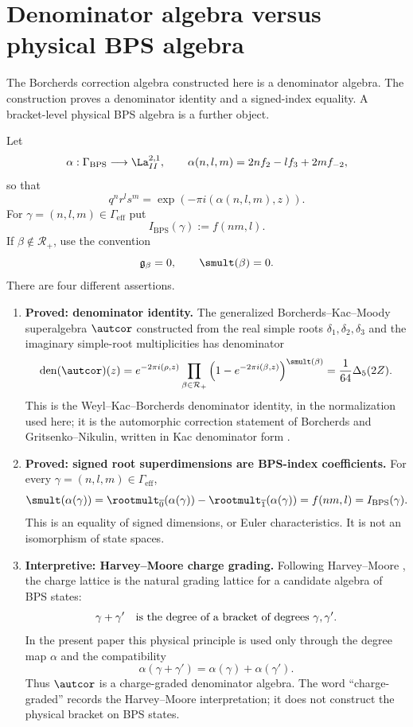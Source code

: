 \section{Denominator algebra versus physical BPS algebra}

The Borcherds correction algebra constructed here is a denominator algebra.
The construction proves a denominator identity and a signed-index equality.
A bracket-level physical BPS algebra is a further object.

\begin{definition}
Let
$$
\alpha:\Gamma_{\mathrm{BPS}}\longrightarrow \La^{2,1}_{II},\qquad
\alpha(n,l,m)=2nf_2-lf_3+2mf_{-2},
$$
so that
$$
q^nr^ls^m=\exp(-\pi i(\alpha(n,l,m),z)).
$$
For $\gamma=(n,l,m)\in\Gamma_{\mathrm{eff}}$ put
$$
I_{\mathrm{BPS}}(\gamma):=f(nm,l).
$$
If $\beta\notin\mathcal R_+$, use the convention
$$
\mathfrak g_\beta=0,\qquad \smult(\beta)=0.
$$
There are four different assertions.

\begin{enumerate}
\item \textbf{Proved: denominator identity.}
The generalized Borcherds--Kac--Moody superalgebra $\autcor$ constructed
from the real simple roots $\delta_1,\delta_2,\delta_3$ and the imaginary
simple-root multiplicities has denominator
$$
\operatorname{den}(\autcor)(z)
=e^{-2\pi i(\rho,z)}
\prod_{\beta\in\mathcal R_+}
\left(1-e^{-2\pi i(\beta,z)}\right)^{\smult(\beta)}
=\frac1{64}\Delta_5(2Z).
$$
This is the Weyl--Kac--Borcherds denominator identity, in the normalization
used here; it is the automorphic correction statement of
Borcherds and Gritsenko--Nikulin, written in Kac denominator form
\cite{KAC:1,B,GN}.

\item \textbf{Proved: signed root superdimensions are BPS-index
coefficients.}
For every $\gamma=(n,l,m)\in\Gamma_{\mathrm{eff}}$,
$$
\smult(\alpha(\gamma))
=\rootmult_{\overline0}(\alpha(\gamma))
-\rootmult_{\overline1}(\alpha(\gamma))
=f(nm,l)=I_{\mathrm{BPS}}(\gamma).
$$
This is an equality of signed dimensions, or Euler characteristics.  It is
not an isomorphism of state spaces.

\item \textbf{Interpretive: Harvey--Moore charge grading.}
Following Harvey--Moore \cite{HM}, the charge lattice is the natural grading
lattice for a candidate algebra of BPS states:
$$
\gamma+\gamma'\quad\hbox{is the degree of a bracket of degrees }
\gamma,\gamma'.
$$
In the present paper this physical principle is used only through the
degree map $\alpha$ and the compatibility
$$
\alpha(\gamma+\gamma')=\alpha(\gamma)+\alpha(\gamma').
$$
Thus $\autcor$ is a charge-graded denominator algebra.  The word
``charge-graded'' records the Harvey--Moore interpretation; it does not
construct the physical bracket on BPS states.


\end{enumerate}
\end{definition}
